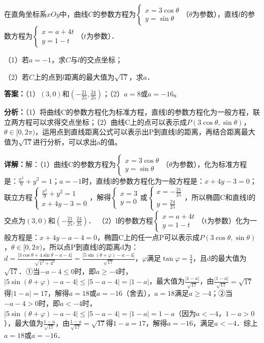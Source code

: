 \begin{question}[points=10]
在直角坐标系$xOy$中，曲线$C$的参数方程为$\begin{cases} x=3\cos\theta \\ y=\sin\theta \end{cases}$（$\theta$为参数），直线$l$的参数方程为$\begin{cases} x=a+4t \\ y=1-t \end{cases}$（$t$为参数）．

（1）若$a=-1$，求$C$与$l$的交点坐标；

（2）若$C$上的点到$l$距离的最大值为$\sqrt{17}$，求$a$．
\begin{solution}
\textbf{答案：}（1）$(3,0)$和$(-\frac{21}{25},\frac{24}{25})$；（2）$a=8$或$a=-16$。

\textbf{分析：}（1）将曲线C的参数方程化为标准方程，直线l的参数方程化为一般方程，联立两方程可以求得交点坐标；（2）曲线C上的点可以表示成$P(3\cos\theta,\sin\theta)$，$\theta\in[0,2\pi)$，运用点到直线距离公式可以表示出P到直线l的距离，再结合距离最大值为$\sqrt{17}$进行分析，可以求出a的值。

\textbf{详解：}解：（1）曲线C的参数方程为$\begin{cases} x=3\cos\theta \\ y=\sin\theta \end{cases}$（$\theta$为参数），化为标准方程是：$\frac{x^2}{9}+y^2=1$；$a=-1$时，直线l的参数方程化为一般方程是：$x+4y-3=0$；联立方程$\begin{cases} \frac{x^2}{9}+y^2=1 \\ x+4y-3=0 \end{cases}$，解得$\begin{cases} x=3 \\ y=0 \end{cases}$或$\begin{cases} x=-\frac{21}{25} \\ y=\frac{24}{25} \end{cases}$，所以椭圆C和直线l的交点为$(3,0)$和$(-\frac{21}{25},\frac{24}{25})$．
（2）l的参数方程$\begin{cases} x=a+4t \\ y=1-t \end{cases}$（t为参数）化为一般方程是：$x+4y-a-4=0$，椭圆C上的任一点P可以表示成$P(3\cos\theta,\sin\theta)$，$\theta\in[0,2\pi)$，所以点P到直线l的距离d为：$d=\frac{|3\cos\theta+4\sin\theta-a-4|}{\sqrt{1^2+4^2}}=\frac{|5\sin(\theta+\varphi)-a-4|}{\sqrt{17}}$，$\varphi$满足$\tan\varphi=\frac{3}{4}$，且d的最大值为$\sqrt{17}$．①当$-a-4\le0$时，即$a\ge-4$时，$|5\sin(\theta+\varphi)-a-4|\le|5-a-4|=|1-a|$，最大值为$\frac{|1-a|}{\sqrt{17}}$，由$\frac{|1-a|}{\sqrt{17}}=\sqrt{17}$得$|1-a|=17$，解得$a=18$或$a=-16$（舍去），$a=18$满足$a\ge-4$；②当$-a-4>0$时，即$a<-4$时，$|5\sin(\theta+\varphi)-a-4|\le|5-a-4|=|1-a|=1-a$（因为$a<-4$，$1-a>0$），最大值为$\frac{1-a}{\sqrt{17}}$，由$\frac{1-a}{\sqrt{17}}=\sqrt{17}$得$1-a=17$，解得$a=-16$，满足$a<-4$．综上$a=18$或$a=-16$．
\end{solution}
\end{question}

